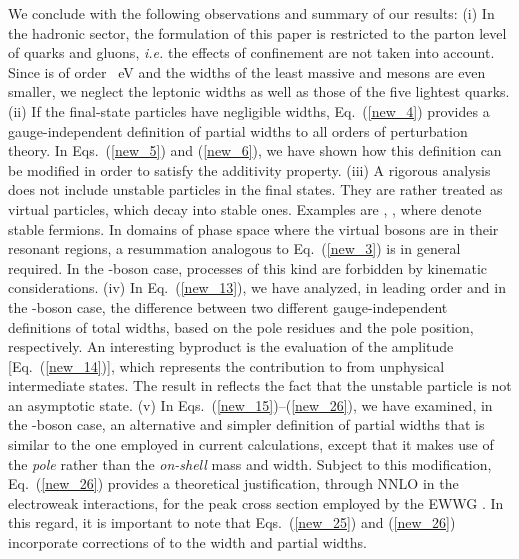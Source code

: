 \documentclass[a4paper,12pt]{article}
\begin{document}
We conclude with the following observations and summary of our results:
(i) In the hadronic sector, the formulation of this paper is restricted to
the parton level of quarks and gluons, {\it i.e.} the effects of confinement
are not taken into account.
Since \myHighlight{$\Gamma_\tau$}\coordHE{} is of order \coordHE{}~eV and the widths of the least
massive \coordHE{} and \coordHE{} mesons are even smaller, we neglect the leptonic widths as
well as those of the five lightest quarks.
(ii) If the final-state particles  have negligible widths, Eq.~(\ref{new_4})
provides a gauge-independent definition of partial widths to all orders of
perturbation theory.
In Eqs.~(\ref{new_5}) and (\ref{new_6}), we have shown how this definition
can be modified in order to satisfy the additivity property.
(iii) A rigorous analysis does not include unstable particles in the final
states.
They are rather treated as virtual particles, which decay into stable ones. 
Examples are \coordHE{},
\coordHE{}, where \coordHE{} denote stable
fermions.
In domains of phase space where the virtual \coordHE{} bosons are in their resonant
regions, a resummation analogous to Eq.~(\ref{new_3}) is in general required. 
In the \coordHE{}-boson case, processes of this kind are forbidden by kinematic
considerations.
(iv) In Eq.~(\ref{new_13}), we have analyzed, in leading order and in the
\coordHE{}-boson case, the difference \coordHE{} between two different
gauge-independent definitions of total widths, based on the pole residues and
the pole position, respectively.
An interesting byproduct is the evaluation of the amplitude
\coordHE{} [Eq.~(\ref{new_14})], which represents the contribution
to \coordHE{} from unphysical intermediate states.
The result \coordHE{} in \coordHE{} reflects the fact that the
unstable particle is not an asymptotic state.
(v) In Eqs.~(\ref{new_15})--(\ref{new_26}), we have examined, in the
\coordHE{}-boson case, an alternative and simpler definition of partial widths that
is similar to the one employed in current calculations, except that it
makes use of the {\it pole} rather than the {\it on-shell} mass and width.
Subject to this modification, Eq.~(\ref{new_26}) provides a theoretical
justification, through NNLO in the electroweak interactions, 
for the peak cross section employed by the EWWG \cite{ewwg}.
In this regard, it is important to note that Eqs.~(\ref{new_25}) and
(\ref{new_26}) incorporate corrections of \coordHE{} to the width and partial
widths. 
\end{document}
